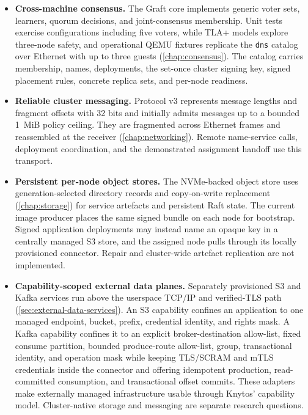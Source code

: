 \begin{itemize}
    \item \textbf{Cross-machine consensus.} The Graft core implements generic
        voter sets, learners, quorum decisions, and joint-consensus membership.
        Unit tests exercise configurations including five voters, while TLA+ models
        explore three-node safety, and operational QEMU fixtures replicate the
        \texttt{dns} catalog over Ethernet with up to three guests
        (\autoref{chap:consensus}). The catalog carries membership, names,
        deployments, the set-once cluster signing key, signed placement rules,
        concrete replica sets, and per-node readiness.

    \item \textbf{Reliable cluster messaging.} Protocol v3 represents message
        lengths and fragment offsets with 32 bits and initially admits messages
        up to a bounded 1~MiB policy ceiling. They are fragmented across
        Ethernet frames and reassembled at the receiver
        (\autoref{chap:networking}). Remote name-service calls, deployment coordination,
        and the demonstrated assignment handoff use this transport.

    \item \textbf{Persistent per-node object stores.} The NVMe-backed object
        store uses generation-selected directory records and copy-on-write
        replacement (\autoref{chap:storage}) for service artefacts and persistent Raft
        state. The current image producer places the same signed bundle on
        each node for bootstrap. Signed application deployments may instead
        name an opaque key in a centrally managed S3 store, and the assigned node
        pulls through its locally provisioned connector. Repair and
        cluster-wide artefact replication are not implemented.

    \item \textbf{Capability-scoped external data planes.} Separately
        provisioned S3 and Kafka services run above the userspace TCP/IP and
        verified-TLS path (\autoref{sec:external-data-services}). An S3
        capability confines an application to one managed endpoint, bucket,
        prefix, credential identity, and rights mask. A Kafka capability
        confines it to an explicit broker-destination allow-list, fixed consume partition, bounded
        produce-route allow-list, group, transactional identity, and operation
        mask while keeping TLS/SCRAM and mTLS credentials inside the connector and offering idempotent production,
        read-committed consumption, and transactional offset commits. These
        adapters make externally managed infrastructure usable through
        Knytos' capability model. Cluster-native storage and messaging are
        separate research questions.


\end{itemize}

